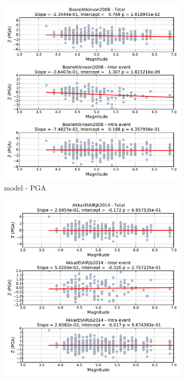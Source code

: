 \begin{figure}[htb]
  \centering
  \begin{subfigure}[b]{0.49\textwidth}
      \includegraphics[width=\textwidth]{./figures/residuals/BA2008_Magnitude_PGA.pdf}
      \caption{\textcite{boore2008} model - PGA}
      \label{fig:pga_mag_ba2008}
  \end{subfigure}
    \begin{subfigure}[b]{0.49\textwidth}
      \includegraphics[width=\textwidth]{./figures/residuals/Akkar2014_Magnitude_PGA.pdf}

\end{subfigure}
\end{figure}
